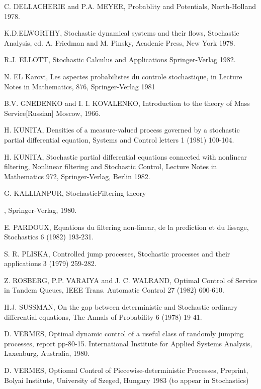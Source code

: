 \begin{thebibliography}{99}
 {C. DELLACHERIE and P.A. MEYER}, Probablity and
  Potentials, North-Holland 1978. 

 {K.D.ELWORTHY}, Stochastic dynamical systems and
  their flows, Stochastic Analysis, ed. A. Friedman and M. Pinsky,
  Acadenic Press, New York 1978. 

 {R.J. ELLOTT}, Stochastic Calculus and
  Applications Springer-Verlag 1982. 

 {N. EL Karovi, Les aspectes probabilistes du
  controle stochastique, in Lecture Notes in Mathematics, 876,
  Springer-Verlag 1981 

 {B.V. GNEDENKO and I. I. KOVALENKO},
  Introduction to the theory of Mass Service[Russian]
  Moscow, 1966. 

 {H. KUNITA}, Densities of a measure-valued process
  governed by a stochastic partial differential equation, Systems and
  Control letters 1 (1981) 100-104. 

 {H. KUNITA}, Stochastic partial differential
  equations connected with nonlinear filtering, Nonlinear filtering
  and Stochastic Control, Lecture Notes in Mathematics 972,
  Springer-Verlag, Berlin 1982. 

 {G. KALLIANPUR}, Stochastic\pageoriginale Filtering
  theory},  Springer-Verlag, 1980. 

 {E. PARDOUX,  Equations du filtering non-linear,
  de la prediction et du lissage}, Stochastics 6 (1982) 193-231. 

 {S. R. PLISKA, Controlled jump processes},
  Stochastic processes and their applications 3 (1979) 259-282. 

 {Z. ROSBERG, P.P. VARAIYA and J. C. WALRAND},
  Optimal Control of Service in Tandem Queues, IEEE
  Trans. Automatic Control 27 (1982) 600-610. 

 {H.J. SUSSMAN}, On the gap between deterministic
  and Stochastic ordinary differential equations, The Annals of
  Probability 6 (1978) 19-41. 

 {D. VERMES}, Optimal dynamic control of a useful
  class of randomly jumping processes, report
  pp-80-15. International Institute for Applied Systems Analysis,
  Laxenburg, Australia, 1980. 

 {D. VERMES}, Optiomal Control of
  Piecewise-deterministic Processes, Preprint, Bolyai Institute,
  University of Szeged, Hungary 1983 (to appear in Stochastics) 


\end{thebibliography}

